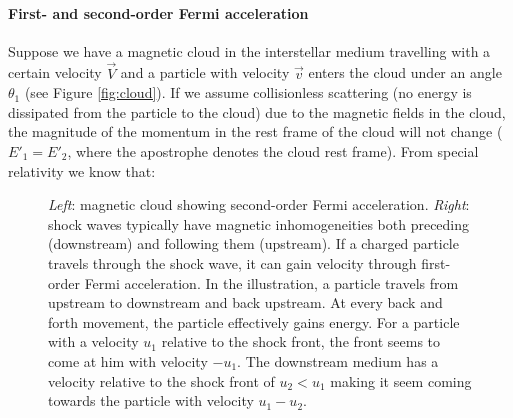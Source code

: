 \paragraph{First- and second-order Fermi acceleration}
\label{para:fermiacceleration}

Suppose we have a magnetic cloud in the interstellar medium travelling with a certain velocity $\vec{V}$ and a particle with velocity $\vec{v}$ enters the cloud under an angle $\theta_1$ (see Figure \ref{fig:cloud}). If we assume collisionless scattering (no energy is dissipated from the particle to the cloud) due to the magnetic fields in the cloud, the magnitude of the momentum in the rest frame of the cloud will not change ($E'_1 = E'_2$, where the apostrophe denotes the cloud rest frame). From special relativity we know that:

\begin{figure}[ht]
\begin{minipage}{6in}
  \centering
  \hspace*{.1in}
\end{minipage}
\caption{\textit{Left}: magnetic cloud showing second-order Fermi acceleration. \textit{Right}: shock waves typically have magnetic inhomogeneities both preceding (downstream) and following them (upstream). If a charged particle travels through the shock wave, it can gain velocity through first-order Fermi acceleration. In the illustration, a particle travels from upstream to downstream and back upstream. At every back and forth movement, the particle effectively gains energy. For a particle with a velocity $u_1$ relative to the shock front, the front seems to come at him with velocity $-u_1$. The downstream medium has a velocity relative to the shock front of $u_2 < u_1$ making it seem coming towards the particle with velocity $u_1-u_2$.}

\end{figure}
